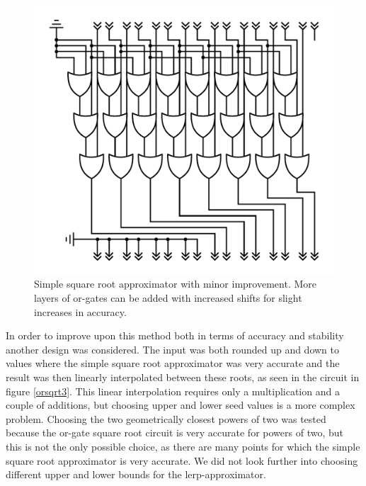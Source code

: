 			\begin{figure}
				\centering
				\caption{Simple square root approximator with minor improvement.
					More layers of or-gates can be added with increased shifts 
					for slight increases in accuracy. }
				\label{orsqrt2}
				\includegraphics[width=0.75\linewidth]{figure/pdf/sqrt3Or.pdf} 
			\end{figure}

			In order to improve upon this method both in terms of accuracy and
			stability another design was considered. The input was both rounded up
			and down to values where the simple square root approximator was very
			accurate and the result was then linearly interpolated between these
			roots, as seen in the circuit in figure \ref{orsqrt3}. This linear interpolation
			requires only a multiplication and a couple of additions, but choosing
			upper and lower seed values is a more complex problem. Choosing the two
			geometrically closest powers of two was tested because the or-gate square
			root circuit is very accurate for powers of two, but this is not the only
			possible choice, as there are many points for which the simple square
			root approximator is very accurate. We did not look further into choosing
			different upper and lower bounds for the lerp-approximator.

